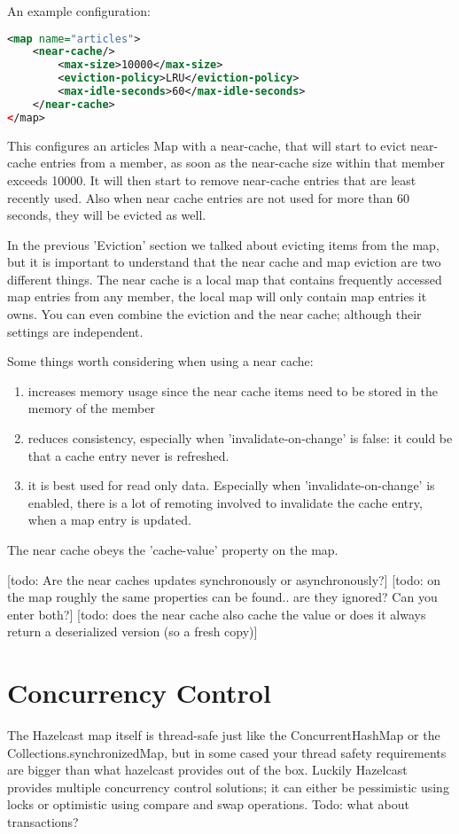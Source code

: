 An example configuration:
\begin{lstlisting}[language=xml]
<map name="articles">
    <near-cache/>
        <max-size>10000</max-size>
        <eviction-policy>LRU</eviction-policy>
        <max-idle-seconds>60</max-idle-seconds>
    </near-cache>
</map>
\end{lstlisting}
This configures an articles Map with a near-cache, that will start to evict near-cache entries from a member, as soon as the near-cache size within that member exceeds 10000. It will then start to remove near-cache entries that are least recently used. Also when near cache entries are not used for more than 60 seconds, they will be evicted as well.

In the previous 'Eviction' section we talked about evicting items from the map, but it is important to understand that the near cache and map eviction are two different things. The near cache is a local map that contains frequently accessed map entries from any member, the local map will only contain map entries it owns. You can even combine the eviction and the near cache; although their settings are independent. 

Some things worth considering when using a near cache:
\begin{enumerate}
\item increases memory usage since the near cache items need to be stored in the memory of the member
\item reduces consistency, especially when 'invalidate-on-change' is false: it could be that a cache entry never is refreshed.
\item it is best used for read only data. Especially when 'invalidate-on-change' is enabled, there is a lot of remoting involved to invalidate the cache entry, when a map entry is updated.
\end{enumerate}

The near cache obeys the 'cache-value' property on the map.

[todo: Are the near caches updates synchronously or asynchronously?]
[todo: on the map roughly the same properties can be found.. are they ignored? Can you enter both?]
[todo: does the near cache also cache the value or does it always return a deserialized version (so a fresh copy)]

\section{Concurrency Control}
The Hazelcast map itself is thread-safe just like the ConcurrentHashMap or the Collections.synchronizedMap, but in some cased your thread safety requirements are bigger than what hazelcast provides out of the box. Luckily Hazelcast provides multiple concurrency control solutions;  it can either be pessimistic using locks or optimistic using compare and swap operations. Todo: what about transactions?

